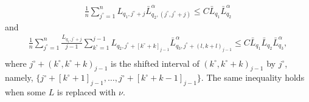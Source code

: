 \documentclass[aos]{imsart}
\begin{document}
\begin{appendix}
\begin{lemma}
\begin{equation*}
    \begin{aligned}
        \frac{1}{n} \sum_{j^\circ=1}^{n} L_{q_1,j^\circ+j} \bar{L}_{q_2,(j^\circ,j^\circ+j)}^\alpha
        \leq C \bar{L}_{q_1} \bar{L}_{q_2}^\alpha 
    \end{aligned}
    \end{equation*}
    and
    \begin{equation*}
    \begin{aligned}
        \frac{1}{n} \sum_{j^\circ=1}^{n} \frac{L_{q_1,j^\circ+j}}{j-1} 
        \sum_{k^\circ=1}^{j-1} L_{q_2,j^\circ+[k^\circ+k]_{j-1}} \bar{L}_{q_3, j^\circ+(l,k+l)_{j-1}}^\alpha
        \leq C \bar{L}_{q_1} \bar{L}_{q_2} \bar{L}_{q_3}^\alpha, \\
    \end{aligned}
    \end{equation*}
    where $j^\circ+(k^\circ,k^\circ+k)_{j-1}$ is the shifted interval of $(k^\circ,k^\circ+k)_{j-1}$ by $j^\circ$, namely, $\{j^\circ+[k^\circ+1]_{j-1}, \dots, j^\circ+[k^\circ+k-1]_{j-1}\}$. The same inequality holds when some $L$ is replaced with $\nu$.
\end{lemma}


\end{appendix}
\end{document}
